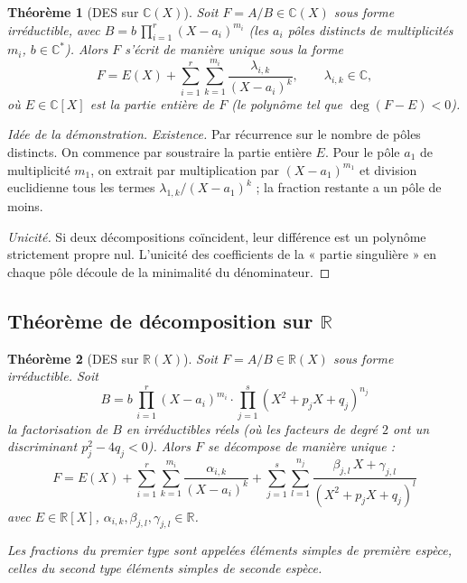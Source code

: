 \documentclass[12pt,a4paper]{report}
\newtheorem{theoreme}{Théorème}[section]
\theoremstyle{definition}
\theoremstyle{remark}
\begin{document}
\begin{theoreme}[DES sur $\mathbb{C}(X)$]
Soit $F = A/B \in \mathbb{C}(X)$ sous forme irréductible, avec $B = b\, \prod_{i=1}^{r} (X - a_i)^{m_i}$ (les $a_i$ pôles distincts de multiplicités $m_i$, $b \in \mathbb{C}^*$). Alors $F$ s'écrit de manière \emph{unique} sous la forme
\[ F = E(X) + \sum_{i=1}^{r} \sum_{k=1}^{m_i} \frac{\lambda_{i, k}}{(X - a_i)^k}, \qquad \lambda_{i, k} \in \mathbb{C}, \]
où $E \in \mathbb{C}[X]$ est la partie entière de $F$ (le polynôme tel que $\deg(F - E) < 0$).
\end{theoreme}

\begin{proof}[Idée de la démonstration]
\emph{Existence.} Par récurrence sur le nombre de pôles distincts. On commence par soustraire la partie entière $E$. Pour le pôle $a_1$ de multiplicité $m_1$, on extrait par multiplication par $(X - a_1)^{m_1}$ et division euclidienne tous les termes $\lambda_{1, k}/(X - a_1)^k$ ; la fraction restante a un pôle de moins.

\emph{Unicité.} Si deux décompositions coïncident, leur différence est un polynôme strictement propre nul. L'unicité des coefficients de la « partie singulière » en chaque pôle découle de la minimalité du dénominateur.
\end{proof}

\subsection{Théorème de décomposition sur $\mathbb{R}$}

\begin{theoreme}[DES sur $\mathbb{R}(X)$]
Soit $F = A/B \in \mathbb{R}(X)$ sous forme irréductible. Soit
\[ B = b\, \prod_{i=1}^{r} (X - a_i)^{m_i} \cdot \prod_{j=1}^{s} (X^2 + p_j X + q_j)^{n_j} \]
la factorisation de $B$ en irréductibles réels (où les facteurs de degré $2$ ont un discriminant $p_j^2 - 4 q_j < 0$). Alors $F$ se décompose de manière \emph{unique} :
\[ \boxed{\ F = E(X) + \sum_{i=1}^{r} \sum_{k=1}^{m_i} \frac{\alpha_{i, k}}{(X - a_i)^k} + \sum_{j=1}^{s} \sum_{l=1}^{n_j} \frac{\beta_{j, l}\, X + \gamma_{j, l}}{(X^2 + p_j X + q_j)^l}\ } \]
avec $E \in \mathbb{R}[X]$, $\alpha_{i, k}, \beta_{j, l}, \gamma_{j, l} \in \mathbb{R}$.

Les fractions du premier type sont appelées \emph{éléments simples de première espèce}, celles du second type \emph{éléments simples de seconde espèce}.
\end{theoreme}
\end{document}

